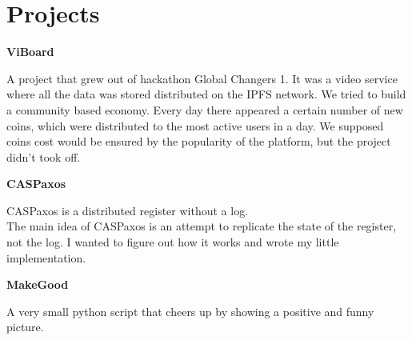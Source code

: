 \documentclass[fontsize=11pt]{article}
\newcommand{\NewPart}[1]{\section*{#1}}
\newcommand{\ProgrammingEntry}[2]{
    \noindent \textbf{#1} \hfill      %

    \noindent \small #2 %
    \normalsize \par}
\begin{document}
\NewPart{Projects}{}
\ProgrammingEntry
{ViBoard}
{A project that grew out of hackathon Global Changers 1. It was a video service where all the data was stored distributed on the IPFS network. We tried to build a community based economy. Every day there appeared a certain number of new coins, which were distributed to the most active users in a day. We supposed coins cost would be ensured by the popularity of the platform, but the project didn't took off.}
\bigskip
\ProgrammingEntry
{CASPaxos}
{CASPaxos is a distributed register without a log. \\ The main idea of CASPaxos is an attempt to replicate the state of the register, not the log. I wanted to figure out how it works and wrote my little implementation.}
\bigskip
\ProgrammingEntry
{MakeGood}
{A very small python script that cheers up by showing a positive and funny picture.}
\end{document}
